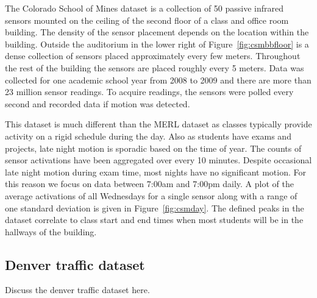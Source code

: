 The Colorado School of Mines dataset is a collection of 50 passive infrared sensors mounted on the ceiling of the second floor of a class and office room building.  The density of the sensor placement depends on the location within the building.  Outside the auditorium in the lower right of Figure~\ref{fig:csmbbfloor} is a dense collection of sensors placed approximately every few meters.  Throughout the rest of the building the sensors are placed roughly every 5 meters.  Data was collected for one academic school year from 2008 to 2009 and there are more than 23 million sensor readings.  To acquire readings, the sensors were polled every second and recorded data if motion was detected.  




This dataset is much different than the MERL dataset as classes typically provide activity on a rigid schedule during the day.  Also as students have exams and projects, late night motion is sporadic based on the time of year.  The counts of sensor activations have been aggregated over every 10 minutes.  Despite occasional late night motion during exam time, most nights have no significant motion.  For this reason we focus on data between 7:00am and 7:00pm daily.  A plot of the average activations of all Wednesdays for a single sensor along with a range of one standard deviation is given in Figure~\ref{fig:csmday}.  The defined peaks in the dataset correlate to class start and end times when most students will be in the hallways of the building.

\subsection{Denver traffic dataset}
Discuss the denver traffic dataset here.